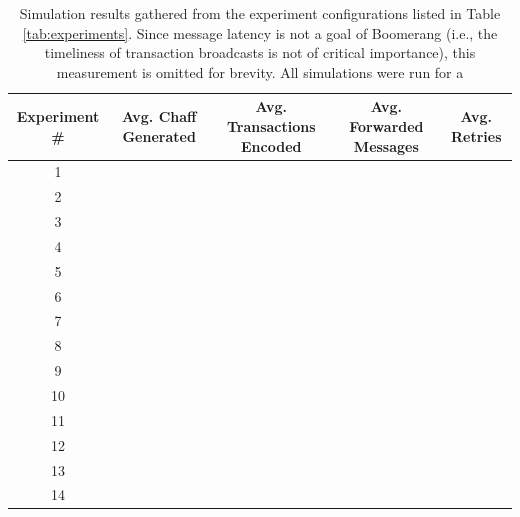 \begin{table}
\begin{center}
\caption{Simulation results gathered from the experiment configurations listed in Table \ref{tab:experiments}. Since message latency is not a goal of Boomerang (i.e., the timeliness of transaction broadcasts is not of critical importance), this measurement is omitted for brevity. All simulations were run for a }
\label{tab:sim-results}
    \begin{tabular}{|c|c|c|c|c|} \hline
    {\bf Experiment \#} & {\bf Avg. Chaff Generated} & {\bf Avg. Transactions Encoded} & {\bf Avg. Forwarded Messages} & {\bf Avg. Retries} \\ \hline
    1  & ~ & ~ & ~ & ~ \\
    2  & ~ & ~ & ~ & ~ \\
    3  & ~ & ~ & ~ & ~ \\
    4  & ~ & ~ & ~ & ~ \\
    5  & ~ & ~ & ~ & ~ \\
    6  & ~ & ~ & ~ & ~ \\
    7  & ~ & ~ & ~ & ~ \\
    8  & ~ & ~ & ~ & ~ \\
    9  & ~ & ~ & ~ & ~ \\
    10 & ~ & ~ & ~ & ~ \\
    11 & ~ & ~ & ~ & ~ \\
    12 & ~ & ~ & ~ & ~ \\
    13 & ~ & ~ & ~ & ~ \\
    14 & ~ & ~ & ~ & ~ \\


    \hline
    \end{tabular}
\end{center}
\end{table}


